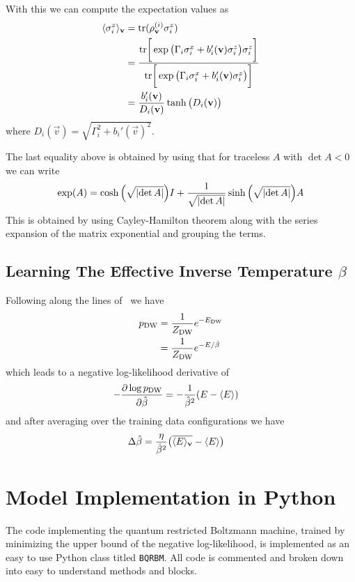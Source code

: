 With this we can compute the expectation values as
\begin{align}
    \langle \sigma_i^z \rangle_{\mathbf{v}}
        &= \text{tr}(\rho_{\mathbf{v}}^{(i)}\sigma_i^z) \\
        &= \frac{\text{tr}\bigg[ \exp \big(\Gamma_i \sigma_i^x + b_i'(\mathbf{v}) \sigma_i^z\big) \sigma_i^z \bigg]}{\text{tr}\bigg[ \exp \big(\Gamma_i \sigma_i^x + b_i'(\mathbf{v}) \sigma_i^z\big) \bigg]} \\
        &= \frac{b_i'(\mathbf{v})}{D_i(\mathbf{v})} \tanh\big(D_i(\mathbf{v})\big)
\end{align}
where \( D_i(\vec{v}) = \sqrt{\Gamma_i^2 + b_i'(\vec{v})^2} \).

The last equality above is obtained by using that for traceless \( A \) with \( \det A < 0 \) we can write
\begin{align}
    \exp(A) = \cosh\Big(\sqrt{\lvert\det A\rvert}\Big) I + \frac{1}{\sqrt{\lvert\det A\rvert}}\sinh\Big(\sqrt{\lvert\det A\rvert}\Big) A
\end{align}
This is obtained by using Cayley-Hamilton theorem along with the series expansion of the matrix exponential and grouping the terms.

\subsection{Learning The Effective Inverse Temperature \( \beta \)}\label{app:learning_beta}
Following along the lines of~\cite{xu_2021} we have
\begin{align}
    p_\text{DW}
        &= \frac{1}{Z_\text{DW}} e^{-E_\text{DW}} \\
        &= \frac{1}{Z_\text{DW}} e^{-E / \hat{\beta}} \\
\end{align}
which leads to a negative log-likelihood derivative of
\begin{align}
    -\frac{\partial \log p_\text{DW}}{\partial\hat{\beta}}
        &= -\frac{1}{\hat{\beta}^2} (E - \langle E \rangle)
\end{align}
and after averaging over the training data configurations we have
\begin{align}
    \Delta\hat{\beta}
        &= \frac{\eta}{\hat{\beta}^2}\big(\overline{\langle E \rangle_{\mathbf{v}}} - \langle E \rangle\big)
\end{align}

\section{Model Implementation in Python}
The code implementing the quantum restricted Boltzmann machine, trained by minimizing the upper bound of the negative log-likelihood, is implemented as an easy to use Python class titled \texttt{BQRBM}.
All code is commented and broken down into easy to understand methods and blocks.
